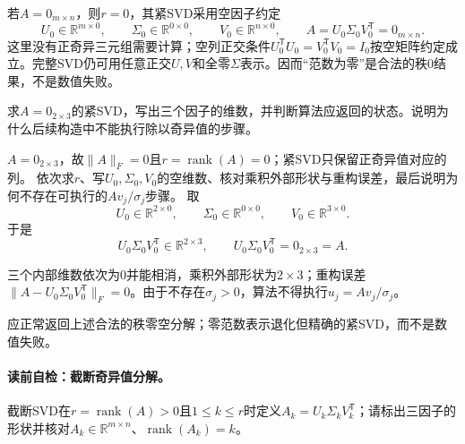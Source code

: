 \begin{definition}\label{def:V4-C03-rank-zero-svd}
若$A=0_{m\times n}$，则$r=0$，其紧SVD采用空因子约定
\[
U_0\in\mathbb R^{m\times0},\qquad
\Sigma_0\in\mathbb R^{0\times0},\qquad
V_0\in\mathbb R^{n\times0},\qquad
A=U_0\Sigma_0V_0^{\mathsf T}=0_{m\times n}.
\]
这里没有正奇异三元组需要计算；空列正交条件$U_0^{\mathsf T}U_0=V_0^{\mathsf T}V_0=I_0$按空矩阵约定成立。完整SVD仍可用任意正交$U,V$和全零$\Sigma$表示。因而“范数为零”是合法的秩$0$结果，不是数值失败。
\end{definition}

\begin{example}[零矩阵回归例]\label{exm:V4-C03-zero-svd}
求$A=0_{2\times3}$的紧SVD，写出三个因子的维数，并判断算法应返回的状态。说明为什么后续构造中不能执行除以奇异值的步骤。
\end{example}
\begin{solution}
\SolGiven $A=0_{2\times3}$，故$\|A\|_F=0$且$r=\operatorname{rank}(A)=0$；紧SVD只保留正奇异值对应的列。
\SolPlan 依次求$r$、写$U_0,\Sigma_0,V_0$的空维数、核对乘积外部形状与重构误差，最后说明为何不存在可执行的$Av_j/\sigma_j$步骤。
\SolDerive 取
\[
U_0\in\mathbb R^{2\times0},\qquad
\Sigma_0\in\mathbb R^{0\times0},\qquad
V_0\in\mathbb R^{3\times0}.
\]
于是
\[
U_0\Sigma_0V_0^{\mathsf T}
\in\mathbb R^{2\times3},
\qquad
U_0\Sigma_0V_0^{\mathsf T}=0_{2\times3}=A.
\]

\SolCheck 三个内部维数依次为$0$并能相消，乘积外部形状为$2\times3$；重构误差
$\|A-U_0\Sigma_0V_0^{\mathsf T}\|_F=0$。由于不存在$\sigma_j>0$，算法不得执行$u_j=Av_j/\sigma_j$。

\SolAnswer 应正常返回上述合法的秩零空分解；零范数表示退化但精确的紧SVD，而不是数值失败。
\end{solution}

\paragraph{读前自检：截断奇异值分解。}截断SVD在$r=\operatorname{rank}(A)>0$且$1\le k\le r$时定义$A_k=U_k\Sigma_kV_k^{\mathsf T}$；请标出三因子的形状并核对$A_k\in\mathbb R^{m\times n}$、$\operatorname{rank}(A_k)=k$。\par

